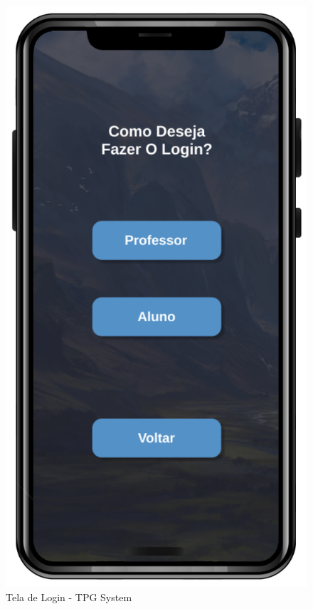 \begin{figure}[!h]
\centering
\caption{Tela de Login - TPG System}%
\label{fig:Tela3}
\includegraphics[scale=0.20]{Illustrations/Tela3.png}
\end{figure}
\\

